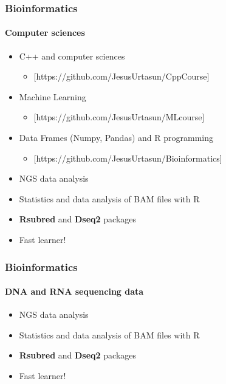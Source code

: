 \documentclass[aspectratio=43]{beamer}
\begin{document}
\begin{frame}
	
	\frametitle{Bioinformatics}
	\framesubtitle{Computer sciences}
	
	\begin{itemize}
		\item C++ and computer sciences
		\begin{itemize}
			\item {\color{blue}[https://github.com/JesusUrtasun/CppCourse]}
		\end{itemize}
		\item Machine Learning
		\begin{itemize}
			\item {\color{blue}[https://github.com/JesusUrtasun/MLcourse]}
		\end{itemize}
		\item Data Frames (Numpy, Pandas) and R programming
		\begin{itemize}
			\item {\color{blue}[https://github.com/JesusUrtasun/Bioinformatics]}
		\end{itemize}
	
	\end{itemize}

	\begin{itemize}
		\item NGS data analysis
		\item Statistics and data analysis of BAM files with R
		\item \textbf{Rsubred} and \textbf{Dseq2} packages
		\item \color{blue} Fast learner!
	\end{itemize}

\end{frame}

\begin{frame}
	
	\frametitle{Bioinformatics}
	\framesubtitle{DNA and RNA sequencing data}
	
	\begin{itemize}
		\item NGS data analysis
		\item Statistics and data analysis of BAM files with R
		\item \textbf{Rsubred} and \textbf{Dseq2} packages
		\item \color{blue} Fast learner!
	\end{itemize}

\end{frame}
\end{document}
